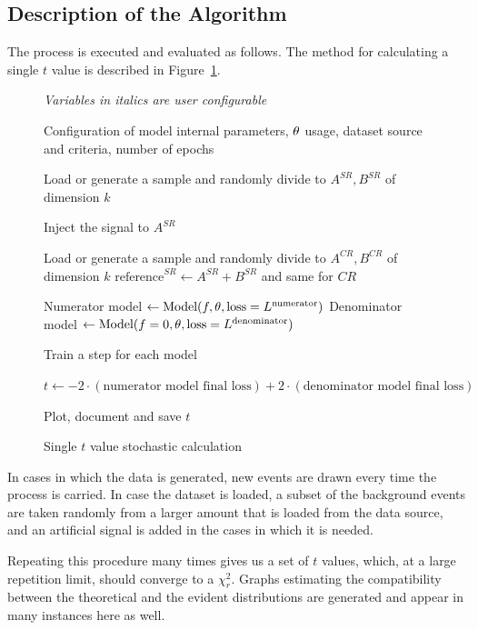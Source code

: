 \documentclass[paper/ddppaper2.tex]{subfiles}
\begin{document}
\subsection{Description of the Algorithm}
The process is executed and evaluated as follows. The method for calculating a single $t$ value is described in Figure~\ref{alg:single_train_algorithm}.

\begin{figure}
\caption{Single $t$ value stochastic calculation}
\label{alg:single_train_algorithm}
\begin{algorithmic}[1]

\Statex \textit{Variables in italics are user configurable}
\Statex %

\Require Configuration of model internal parameters, ${\theta}$ usage, dataset source and criteria, number of epochs

\State Load or generate a sample and randomly divide to $A^{SR}, B^{SR}$ of dimension $\mathit{k}$

    \State Inject the signal to $A^{SR}$
\EndIf

\State Load or generate a sample and randomly divide to $A^{CR}, B^{CR}$ of dimension $\mathit{k}$
\State $\text{reference}^{SR} \gets A^{SR} + B^{SR}$ and same for $CR$

\State Numerator model $\gets \text{Model}(f, {\theta}, \text{loss} = L^{\text{numerator}})$
\State Denominator model $\gets \text{Model}(f = 0, {\theta}, \text{loss} = L^{\text{denominator}})$

    \State Train a step for each model
\EndFor

\State $t \gets -2 \cdot (\text{numerator model final loss}) + 2 \cdot (\text{denominator model final loss})$

\State Plot, document and save
\State \Return $t$

\end{algorithmic}
\end{figure}

In cases in which the data is generated, new events are drawn every time the process is carried. In case the dataset is loaded, a subset of the background events are taken randomly from a larger amount that is loaded from the data source, and an artificial signal is added in the cases in which it is needed.

Repeating this procedure many times gives us a set of $t$ values, which, at a large repetition limit, should converge to a $\chi^2_r$. Graphs estimating the compatibility between the theoretical and the evident distributions are generated and appear in many instances here as well.
\end{document}

